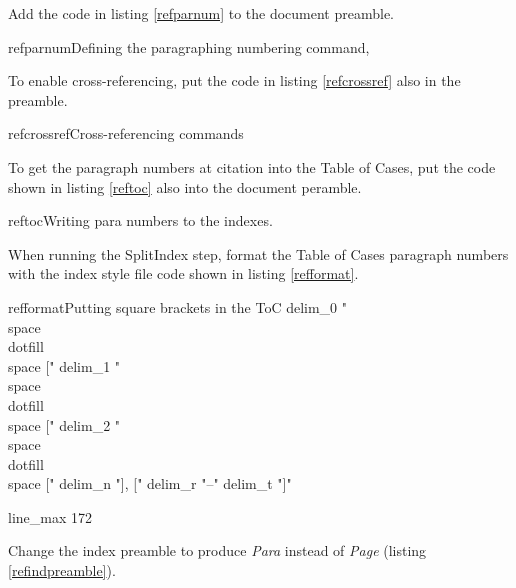 \p Add the code in listing \ref{refparnum} to the document preamble.

\begin{dov}{refparnum}{Defining the paragraphing numbering command, }
\renewcommand{\theparno}{\arabic{parno}}
\newcommand{\p}{\refstepcounter{parno}%
\noindent[\theparno]\ } 
\setcounter{secnumdepth}{4}
\setcounter{parno}{0}
\end{dov}


\p To enable cross-referencing, put the code in listing \ref{refcrossref} also in the preamble.

\begin{dov}{refcrossref}{Cross-referencing commands}
\newcommand\definname{para}
\newcommand{\paradef}[1]{\label{#1}}
\newcommand\pararef[1]{\definname\ [\ref{#1}]}
\end{dov}

\p To get the paragraph numbers at citation into the Table of Cases, put the code shown in listing \ref{reftoc} also into the document peramble.

\begin{dov}{reftoc}{Writing para numbers to the indexes.}
\end{dov}

\p When running the SplitIndex step, format the Table of Cases paragraph numbers with the index style file code shown in listing \ref{refformat}.

\begin{dov}{refformat}{Putting square brackets in the ToC}
delim_0 "\\space\\dotfill\\space ["
delim_1 "\\space\\dotfill\\space ["
delim_2 "\\space\\dotfill\\space ["
delim_n "], ["
delim_r "--"
delim_t "]"

line_max 172
\end{dov}

\p Change the index preamble to produce \textit{Para} instead of \textit{Page} (listing \ref{refindpreamble}).

